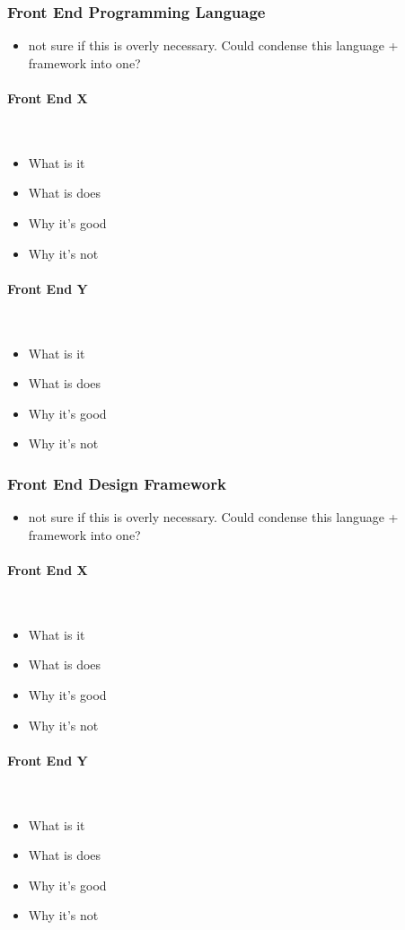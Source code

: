 \subsubsection{Front End Programming Language}
{\color{red}
	\begin{itemize}
		\item not sure if this is overly necessary. Could condense this language + framework into one?
	\end{itemize}
}

\paragraph{Front End X}\ \\
{\color{red}
	\begin{itemize}
		\item What is it
		\item What is does
		\item Why it's good
		\item Why it's not
	\end{itemize}
}

\paragraph{Front End Y}\ \\
{\color{red}
	\begin{itemize}
		\item What is it
		\item What is does
		\item Why it's good
		\item Why it's not
	\end{itemize}
}


\subsubsection{Front End Design Framework}
{\color{red}
	\begin{itemize}
		\item not sure if this is overly necessary. Could condense this language + framework into one?
	\end{itemize}
}

\paragraph{Front End X}\ \\
{\color{red}
	\begin{itemize}
		\item What is it
		\item What is does
		\item Why it's good
		\item Why it's not
	\end{itemize}
}

\paragraph{Front End Y}\ \\
{\color{red}
	\begin{itemize}
		\item What is it
		\item What is does
		\item Why it's good
		\item Why it's not
	\end{itemize}
}
